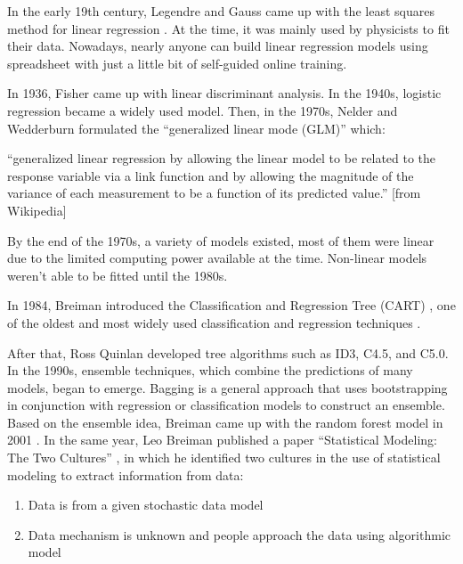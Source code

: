 \documentclass[
  12pt,
]{krantz}
\providecommand{\tightlist}{%
  \setlength{\itemsep}{0pt}\setlength{\parskip}{0pt}}
\renewenvironment{quote}{\begin{VF}}{\end{VF}}
\begin{document}
In the early 19th century, Legendre and Gauss came up with the least squares method for linear regression . At the time, it was mainly used by physicists to fit their data. Nowadays, nearly anyone can build linear regression models using spreadsheet with just a little bit of self-guided online training.

In 1936, Fisher came up with linear discriminant analysis. In the 1940s, logistic regression  became a widely used model. Then, in the 1970s, Nelder and Wedderburn formulated the ``generalized linear mode (GLM)'' which:

\begin{quote}
``generalized linear regression by allowing the linear model to be related to the response variable via a link function and by allowing the magnitude of the variance of each measurement to be a function of its predicted value.'' {[}from Wikipedia{]}
\end{quote}

By the end of the 1970s, a variety of models existed, most of them were linear due to the limited computing power available at the time. Non-linear models weren't able to be fitted until the 1980s.

In 1984, Breiman introduced the Classification and Regression Tree (CART) , one of the oldest and most widely used classification and regression techniques \citep{Breiman1984}.

After that, Ross Quinlan developed tree algorithms such as ID3, C4.5, and C5.0. In the 1990s, ensemble techniques, which combine the predictions of many models, began to emerge. Bagging is a general approach that uses bootstrapping in conjunction with regression or classification models to construct an ensemble. Based on the ensemble idea, Breiman came up with the random forest  model in 2001 \citep{Breiman2001}. In the same year, Leo Breiman published a paper ``Statistical Modeling: The Two Cultures'' \citep{Breiman2001TwoCulture}, in which he identified two cultures in the use of statistical modeling to extract information from data:

\begin{enumerate}
\def\labelenumi{(\arabic{enumi})}
\tightlist
\item
  Data is from a given stochastic data model
\item
  Data mechanism is unknown and people approach the data using algorithmic model
\end{enumerate}
\end{document}

